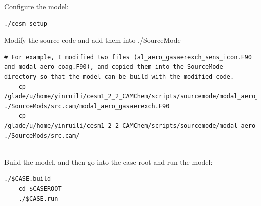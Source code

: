 \documentclass[12pt, fullpage]{uiucthesis2009}
\begin{document}
	Configure the model:
	\begin{lstlisting}[xleftmargin=0.01\textwidth, xrightmargin=0.01\textwidth]
	./cesm_setup
	\end{lstlisting}
	
	Modify the source code and add them into ./SourceMode
	\begin{lstlisting}[xleftmargin=0.01\textwidth, xrightmargin=0.01\textwidth]
	# For example, I modified two files (al_aero_gasaerexch_sens_icon.F90 and modal_aero_coag.F90), and copied them into the SourceMode directory so that the model can be build with the modified code. 
	cp /glade/u/home/yinruili/cesm1_2_2_CAMChem/scripts/sourcemode/modal_aero_gasaerexch.F90 ./SourceMods/src.cam/modal_aero_gasaerexch.F90
	cp /glade/u/home/yinruili/cesm1_2_2_CAMChem/scripts/sourcemode/modal_aero_coag.F90 ./SourceMods/src.cam/
	
	\end{lstlisting}
	
	Build the model, and then go into the case root and run the model:
	\begin{lstlisting}[xleftmargin=0.01\textwidth, xrightmargin=0.01\textwidth]
	./$CASE.build
	cd $CASEROOT
	./$CASE.run
	\end{lstlisting}


\appendix*



\backmatter



\end{document}
